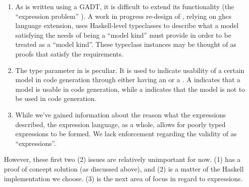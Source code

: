 \begin{enumerate}

	\item As \ModelKinds{} is written using a GADT, it is difficult to extend
	      its functionality (the ``expression problem''
	      \cite{Wadler1999ExpressionProblem}). A work in progress re-design of
	      \ModelKinds{}, relying on \acs{ghc}s \ConstraintKinds{}
	      \cite{GHC2020ConstraintKinds} language extension, uses Haskell-level
	      typeclasses to describe what a model satisfying the needs of being a
	      ``model kind'' must provide in order to be treated as a ``model
	      kind''. These typeclass instances may be thought of as proofs that
	      satisfy the requirements.

	\item The type parameter in \ModelKinds{} is peculiar. It is used to
	      indicate usability of a certain model in code generation through
	      either having an \Expr{} or a \ModelExpr{}. A  indicates that a model is usable in code generation, while a
	       indicates that the model is not to be
	      used in code generation.

	\item While we've gained information about the reason what the expressions
	      described, the expression language, as a whole, allows for poorly
	      typed expressions to be formed. We lack enforcement regarding the
	      validity of \Expr{} as ``expressions''.

\end{enumerate}

However, these first two (2) issues are relatively unimportant for now. (1) has
a proof of concept solution (as discussed above), and (2) is a matter of the
Haskell implementation we choose. (3) is the next area of focus in regard to
expressions.

